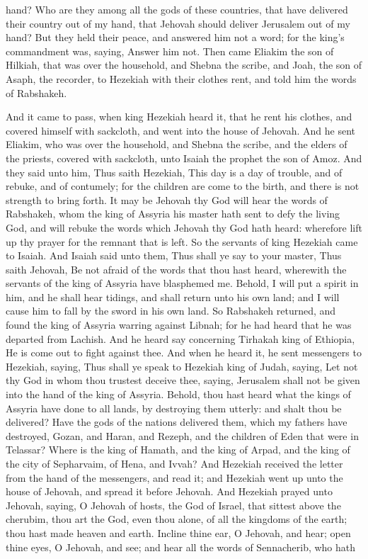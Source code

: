 hand? Who are they among all the gods of these countries, that have delivered their country out of my hand, that Jehovah should deliver Jerusalem out of my hand?  But they held their peace, and answered him not a word; for the king’s commandment was, saying, Answer him not. Then came Eliakim the son of Hilkiah, that was over the household, and Shebna the scribe, and Joah, the son of Asaph, the recorder, to Hezekiah with their clothes rent, and told him the words of Rabshakeh. 

And it came to pass, when king Hezekiah heard it, that he rent his clothes, and covered himself with sackcloth, and went into the house of Jehovah. And he sent Eliakim, who was over the household, and Shebna the scribe, and the elders of the priests, covered with sackcloth, unto Isaiah the prophet the son of Amoz. And they said unto him, Thus saith Hezekiah, This day is a day of trouble, and of rebuke, and of contumely; for the children are come to the birth, and there is not strength to bring forth. It may be Jehovah thy God will hear the words of Rabshakeh, whom the king of Assyria his master hath sent to defy the living God, and will rebuke the words which Jehovah thy God hath heard: wherefore lift up thy prayer for the remnant that is left.  So the servants of king Hezekiah came to Isaiah. And Isaiah said unto them, Thus shall ye say to your master, Thus saith Jehovah, Be not afraid of the words that thou hast heard, wherewith the servants of the king of Assyria have blasphemed me. Behold, I will put a spirit in him, and he shall hear tidings, and shall return unto his own land; and I will cause him to fall by the sword in his own land.  So Rabshakeh returned, and found the king of Assyria warring against Libnah; for he had heard that he was departed from Lachish. And he heard say concerning Tirhakah king of Ethiopia, He is come out to fight against thee. And when he heard it, he sent messengers to Hezekiah, saying, Thus shall ye speak to Hezekiah king of Judah, saying, Let not thy God in whom thou trustest deceive thee, saying, Jerusalem shall not be given into the hand of the king of Assyria. Behold, thou hast heard what the kings of Assyria have done to all lands, by destroying them utterly: and shalt thou be delivered? Have the gods of the nations delivered them, which my fathers have destroyed, Gozan, and Haran, and Rezeph, and the children of Eden that were in Telassar? Where is the king of Hamath, and the king of Arpad, and the king of the city of Sepharvaim, of Hena, and Ivvah?  And Hezekiah received the letter from the hand of the messengers, and read it; and Hezekiah went up unto the house of Jehovah, and spread it before Jehovah. And Hezekiah prayed unto Jehovah, saying, O Jehovah of hosts, the God of Israel, that sittest above the cherubim, thou art the God, even thou alone, of all the kingdoms of the earth; thou hast made heaven and earth. Incline thine ear, O Jehovah, and hear; open thine eyes, O Jehovah, and see; and hear all the words of Sennacherib, who hath 